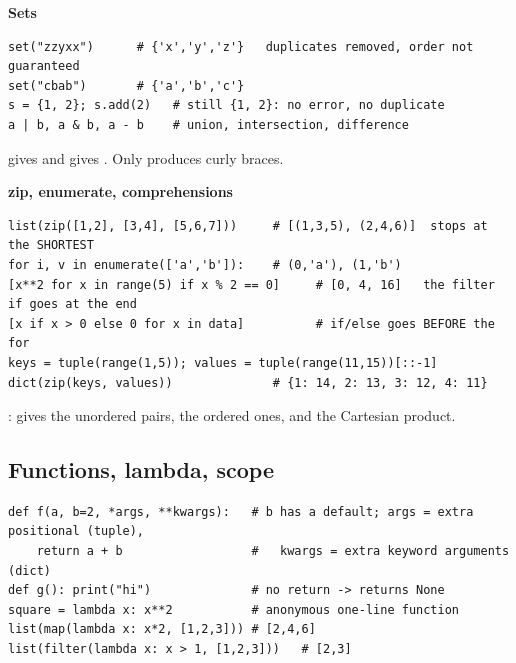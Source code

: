\textbf{Sets}
\begin{codebox}
\begin{Verbatim}
set("zzyxx")      # {'x','y','z'}   duplicates removed, order not guaranteed
set("cbab")       # {'a','b','c'}
s = {1, 2}; s.add(2)   # still {1, 2}: no error, no duplicate
a | b, a & b, a - b    # union, intersection, difference
\end{Verbatim}
\end{codebox}
 gives  and  gives . Only  produces curly braces.

\textbf{zip, enumerate, comprehensions}
\begin{codebox}
\begin{Verbatim}
list(zip([1,2], [3,4], [5,6,7]))     # [(1,3,5), (2,4,6)]  stops at the SHORTEST
for i, v in enumerate(['a','b']):    # (0,'a'), (1,'b')
[x**2 for x in range(5) if x % 2 == 0]     # [0, 4, 16]   the filter if goes at the end
[x if x > 0 else 0 for x in data]          # if/else goes BEFORE the for
keys = tuple(range(1,5)); values = tuple(range(11,15))[::-1]
dict(zip(keys, values))              # {1: 14, 2: 13, 3: 12, 4: 11}
\end{Verbatim}
\end{codebox}
:  gives the unordered pairs,  the ordered ones, and  the Cartesian product.

\subsection{Functions, lambda, scope}
\begin{codebox}
\begin{Verbatim}
def f(a, b=2, *args, **kwargs):   # b has a default; args = extra positional (tuple),
    return a + b                  #   kwargs = extra keyword arguments (dict)
def g(): print("hi")              # no return -> returns None
square = lambda x: x**2           # anonymous one-line function
list(map(lambda x: x*2, [1,2,3])) # [2,4,6]
list(filter(lambda x: x > 1, [1,2,3]))   # [2,3]
\end{Verbatim}
\end{codebox}

